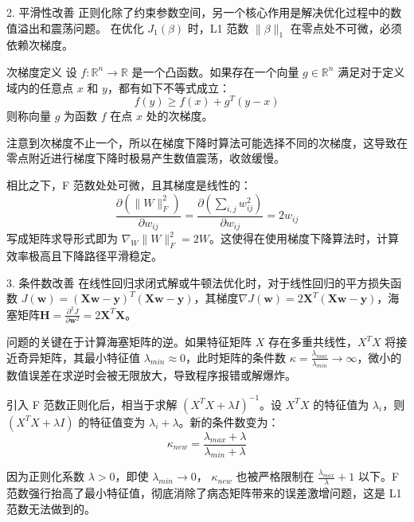 \documentclass[aspectratio=169]{beamer}
\begin{document}
\begin{frame}{2. 平滑性改善}
    正则化除了约束参数空间，另一个核心作用是解决优化过程中的数值溢出和震荡问题。
    在优化 $J_1(\beta)$ 时，L1 范数 $\| \beta \|_1$ 在零点处不可微，必须依赖次梯度。
    
    \begin{block}{次梯度定义}
        设 $f: \mathbb{R}^n \to \mathbb{R}$ 是一个凸函数。如果存在一个向量 $g \in \mathbb{R}^n$ 满足对于定义域内的任意点 $x$ 和 $y$，都有如下不等式成立：
        $$f(y) \geq f(x) + g^T(y - x)$$
        则称向量 $g$ 为函数 $f$ 在点 $x$ 处的次梯度。
    \end{block}
    
    注意到次梯度不止一个，所以在梯度下降时算法可能选择不同的次梯度，这导致在零点附近进行梯度下降时极易产生数值震荡，收敛缓慢。
    
    相比之下，F 范数处处可微，且其梯度是线性的：
    $$ \frac{\partial (\|W\|_F^2)}{\partial w_{ij}} = \frac{\partial (\sum_{i,j} w_{ij}^2)}{\partial w_{ij}} = 2w_{ij} $$
    写成矩阵求导形式即为 $\nabla_W \|W\|_F^2 = 2W$。这使得在使用梯度下降算法时，计算效率极高且下降路径平滑稳定。
\end{frame}

\begin{frame}{3. 条件数改善}
    在线性回归求闭式解或牛顿法优化时，对于线性回归的平方损失函数 $J(\mathbf{w}) = (\mathbf{X}\mathbf{w} - \mathbf{y})^T(\mathbf{X}\mathbf{w} - \mathbf{y})$，其梯度$\nabla J(\mathbf{w}) = 2\mathbf{X}^T(\mathbf{X}\mathbf{w} - \mathbf{y})$，海塞矩阵$\mathbf{H} = \frac{\partial^2 J}{\partial \mathbf{w}^2} = 2\mathbf{X}^T\mathbf{X}$。
    
    问题的关键在于计算海塞矩阵的逆。如果特征矩阵 $X$ 存在多重共线性，$X^TX$ 将接近奇异矩阵，其最小特征值 $\lambda_{min} \approx 0$，此时矩阵的条件数 $\kappa = \frac{\lambda_{max}}{\lambda_{min}} \to \infty$，微小的数值误差在求逆时会被无限放大，导致程序报错或解爆炸。
    
    引入 F 范数正则化后，相当于求解 $(X^TX + \lambda I)^{-1}$。设 $X^TX$ 的特征值为 $\lambda_i$，则 $(X^TX + \lambda I)$ 的特征值变为 $\lambda_i + \lambda$。新的条件数变为：
    $$ \kappa_{new} = \frac{\lambda_{max} + \lambda}{\lambda_{min} + \lambda} $$
    
    因为正则化系数 $\lambda > 0$，即使 $\lambda_{min} \to 0$， $\kappa_{new}$ 也被严格限制在 $\frac{\lambda_{max}}{\lambda} + 1$ 以下。F 范数强行抬高了最小特征值，彻底消除了病态矩阵带来的误差激增问题，这是 L1 范数无法做到的。
\end{frame}
\end{document}
